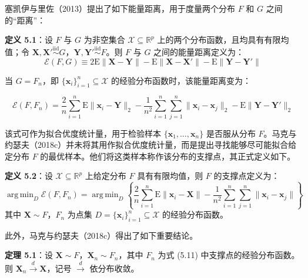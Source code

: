 \documentclass{ctexart}
\DeclareMathOperator*{\argmin}{arg\,min}
\begin{document}
塞凯伊与里佐（2013）提出了如下能量距离，用于度量两个分布 $F$ 和 $G$ 之间的“距离”：

\begin{mdquote}
\textbf{定义 5.1}：设 $F$ 与 $G$ 为非空集合 $\mathcal{X}\subseteq\mathbb{R}^p$ 上的两个分布函数，且均具有有限均值；令 $\boldsymbol{X},\boldsymbol{X}'\stackrel{\text{iid}}{\sim}G$，$\boldsymbol{Y},\boldsymbol{Y}'\stackrel{\text{iid}}{\sim}F$。则 $F$ 与 $G$ 之间的能量距离定义为：\begin{equation*}
\mathcal{E}(F,G)\equiv2\mathrm{E}\|\boldsymbol{X}-\boldsymbol{Y}\|-\mathrm{E}\|\boldsymbol{X}-\boldsymbol{X}'\|-\mathrm{E}\|\boldsymbol{Y}-\boldsymbol{Y}'\|\tag{5.9}
\end{equation*}
\end{mdquote}

当 $G=F_n$，即 $\{\boldsymbol{x}_i\}_{i=1}^n\subseteq\mathcal{X}$ 的经验分布函数时，该能量距离变为：

\begin{equation*}
\mathcal{E}(F,F_n)=\frac{2}{n}\sum_{i=1}^n\mathrm{E}\|\boldsymbol{x}_i-\boldsymbol{Y}\|_2-\frac{1}{n^2}\sum_{i=1}^n\sum_{j=1}^n\|\boldsymbol{x}_i-\boldsymbol{x}_j\|_2-\mathrm{E}\|\boldsymbol{Y}-\boldsymbol{Y}'\|_2
\tag{5.10}
\end{equation*}

该式可作为拟合优度统计量，用于检验样本 $\{\boldsymbol{x}_1,\dots,\boldsymbol{x}_n\}$ 是否服从分布 $F$。马克与约瑟夫（2018c）并未将其用作拟合优度统计量，而是提出寻找能够尽可能拟合给定分布 $F$ 的最优样本。他们将这类样本称作该分布的支撑点，其正式定义如下。

\begin{mdquote}
\textbf{定义 5.2}：设 $\mathcal{X}\subseteq\mathbb{R}^p$ 上给定分布 $F$ 具有有限均值，则 $F$ 的支撑点定义为： \begin{equation*}
\argmin_{D}\mathcal{E}(F,F_n)=\argmin_{D}\left\{\frac{2}{n}\sum_{i=1}^{n}\mathrm{E}\|\boldsymbol{x}_i-\boldsymbol{X}\|-\frac{1}{n^2}\sum_{i=1}^{n}\sum_{j=1}^{n}\|\boldsymbol{x}_i-\boldsymbol{x}_j\|\right\}\tag{5.11}
\end{equation*} 其中 $\boldsymbol{X}\sim F$，$F_n$ 为点集 $D=\{\boldsymbol{x}_i\}_{i=1}^{n}\subseteq\mathcal{X}$ 的经验分布函数。
\end{mdquote}

此外，马克与约瑟夫（2018c）得出了如下重要结论。

\begin{mdquote}
\textbf{定理 5.1}：设 $\boldsymbol{X}\sim F$，$\boldsymbol{X}_n\sim F_n$，其中 $F_n$ 为式 (5.11) 中支撑点的经验分布函数。则 $\boldsymbol{X}_n\stackrel{d}{\to}\boldsymbol{X}$，记号 $\stackrel{d}{\to}$ 依分布收敛。
\end{mdquote}
\end{document}
